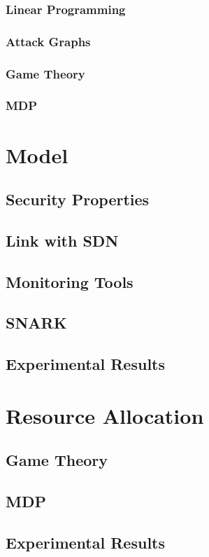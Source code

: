 \documentclass[a4paper, 11pt]{article}
\begin{document}
\subsubsection{Linear Programming}
\cite{Stott1979,ofdma-awad2008,monitoring-nash1977,lpmedical-kwak1997,wirelessvirt-moubayed2015,transportation-wey2007,Ye2017a,book-LP,Papagianni2013}
\subsubsection{Attack Graphs}
\cite{Kanaoka2009,mitigateAPT-johnson2013}
\subsubsection{Game Theory}
\cite{MuraliKodialam2004,Huang2018,Chen2009,interdep-ismail2017,Kantzavelou2010,Nguyen2009,Zhu2009,Roy2010,Sallhammar2007,Kiennert2018}
\subsubsection{MDP}
\cite{Chades2014,Bokani2015,Anupama2014,bellman1957,Wang2013}


\section{Model}
\subsection{Security Properties}
\subsection{Link with SDN}
\subsection{Monitoring Tools}
\subsection{SNARK}
\subsection{Experimental Results}

\section{Resource Allocation}
\subsection{Game Theory}
\subsection{MDP}
\subsection{Experimental Results}




{}

\end{document}
